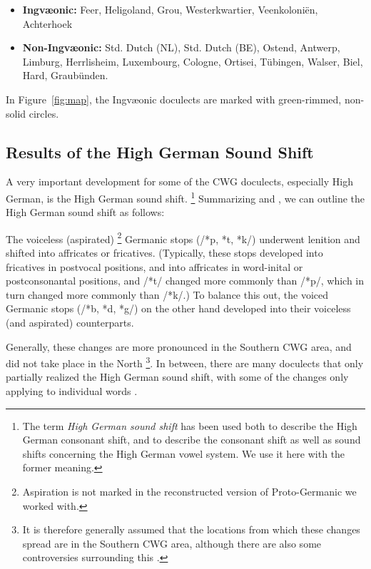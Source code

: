 \documentclass[a4paper]{article}
\begin{document}
\begin{itemize}
\item 
\textbf{Ingv\ae{}onic:}
Feer, Heligoland, Grou,
Westerkwartier, Veenkoloni\"{e}n, Achterhoek

\item
\textbf{Non-Ingv\ae{}onic:}
Std. Dutch (NL), Std. Dutch (BE), Ostend, Antwerp, Limburg,
Herrlisheim, Luxembourg, Cologne,
Ortisei, T\"{u}bingen, Walser, Biel, Hard, Graub\"{u}nden.
\end{itemize}

In Figure~\ref{fig:map}, the Ingv\ae{}onic doculects
are marked with green-rimmed, non-solid circles.

\subsection{Results of the High German Sound Shift}

A very important development for some of the CWG doculects,
especially High German, is the High German sound shift.
\footnote{
The term \textit{High German sound shift} has been used both
to describe the High German consonant shift,
and to describe the consonant shift as well as
sound shifts concerning the High German vowel system.
We use it here with the former meaning.
}
Summarizing \citet[pp. 47--48]{harbert2007germanic}
and \citet[pp. 62--64]{koenig2015dtv},
we can outline the High German sound shift as follows:

The voiceless (aspirated)
\footnote{
Aspiration is not marked in the reconstructed version of Proto-Germanic
we worked with.
}
Germanic stops (/*p, *t, *k/)
underwent lenition and shifted into affricates or fricatives.
(Typically, these stops developed into fricatives in postvocal positions,
and into affricates in word-inital or postconsonantal positions,
and /*t/ changed more commonly than /*p/,
which in turn changed more commonly than /*k/.)
To balance this out,
the voiced Germanic stops (/*b, *d, *g/) on the other hand
developed into their voiceless (and aspirated) counterparts.

Generally, these changes are more pronounced
in the Southern CWG area, and did not take place in the North
\cite[p. 33]{noble1983modern}
\footnote{
It is therefore generally assumed that the locations
from which these changes spread are in the Southern CWG area,
although there are also some controversies surrounding this
\citep[pp. 155--181]{goblirsch2005lautverschiebungen}.
}.
In between, there are many doculects
that only partially realized the High German sound shift,
with some of the changes only applying to individual words
\citep[p. 63]{koenig2015dtv}.
\end{document}
